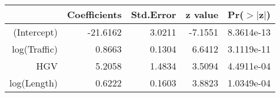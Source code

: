 \begin{table}[ht]
\centering
\begin{tabular}{rrrrr}
  \hline
 & Coefficients & Std.Error & z value & Pr($>$$|$z$|$) \\ 
  \hline
(Intercept) & -21.6162 & 3.0211 & -7.1551 & 8.3614e-13 \\ 
  log(Traffic) & 0.8663 & 0.1304 & 6.6412 & 3.1119e-11 \\ 
  HGV & 5.2058 & 1.4834 & 3.5094 & 4.4911e-04 \\ 
  log(Length) & 0.6222 & 0.1603 & 3.8823 & 1.0349e-04 \\ 
   \hline
\end{tabular}
\end{table}
